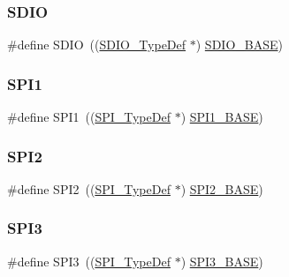 \subsubsection{\texorpdfstring{SDIO}{SDIO}}
{\footnotesize\ttfamily \#define S\+D\+IO~((\mbox{\hyperlink{struct_s_d_i_o___type_def}{S\+D\+I\+O\+\_\+\+Type\+Def}} $\ast$) \mbox{\hyperlink{group___peripheral__memory__map_ga95dd0abbc6767893b4b02935fa846f52}{S\+D\+I\+O\+\_\+\+B\+A\+SE}})}

\mbox{\label{group___peripheral__declaration_gad483be344a28ac800be8f03654a9612f}} 
\subsubsection{\texorpdfstring{SPI1}{SPI1}}
{\footnotesize\ttfamily \#define S\+P\+I1~((\mbox{\hyperlink{struct_s_p_i___type_def}{S\+P\+I\+\_\+\+Type\+Def}} $\ast$) \mbox{\hyperlink{group___peripheral__memory__map_ga50cd8b47929f18b05efbd0f41253bf8d}{S\+P\+I1\+\_\+\+B\+A\+SE}})}

\mbox{\label{group___peripheral__declaration_gaf2c3d8ce359dcfbb2261e07ed42af72b}} 
\subsubsection{\texorpdfstring{SPI2}{SPI2}}
{\footnotesize\ttfamily \#define S\+P\+I2~((\mbox{\hyperlink{struct_s_p_i___type_def}{S\+P\+I\+\_\+\+Type\+Def}} $\ast$) \mbox{\hyperlink{group___peripheral__memory__map_gac3e357b4c25106ed375fb1affab6bb86}{S\+P\+I2\+\_\+\+B\+A\+SE}})}

\mbox{\label{group___peripheral__declaration_gab2339cbf25502bf562b19208b1b257fc}} 
\subsubsection{\texorpdfstring{SPI3}{SPI3}}
{\footnotesize\ttfamily \#define S\+P\+I3~((\mbox{\hyperlink{struct_s_p_i___type_def}{S\+P\+I\+\_\+\+Type\+Def}} $\ast$) \mbox{\hyperlink{group___peripheral__memory__map_gae634fe8faa6922690e90fbec2fc86162}{S\+P\+I3\+\_\+\+B\+A\+SE}})}


